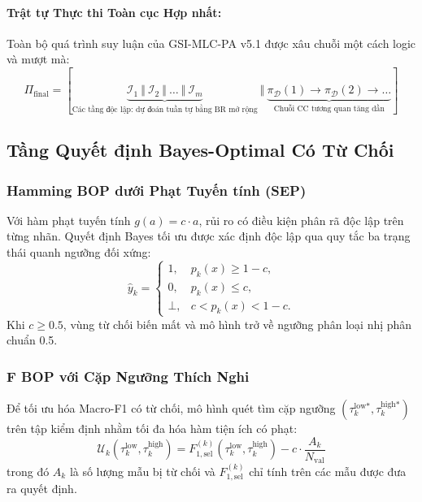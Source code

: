 \documentclass[11pt,a4paper]{article}
\begin{document}
\paragraph{Trật tự Thực thi Toàn cục Hợp nhất:}
Toàn bộ quá trình suy luận của GSI-MLC-PA v5.1 được xâu chuỗi một cách logic và mượt mà:
\begin{equation}
\Pi_{\text{final}} = \left[ \underbrace{\mathcal{I}_1 \ \Vert \ \mathcal{I}_2 \ \Vert \ \dots \ \Vert \ \mathcal{I}_m}_{\text{Các tầng độc lập: dự đoán tuần tự bằng BR mở rộng}} \ \Vert \ \underbrace{\pi_{\mathcal{D}}(1) \to \pi_{\mathcal{D}}(2) \to \dots}_{\text{Chuỗi CC tương quan tăng dần}} \right]
\end{equation}

\subsection{Tầng Quyết định Bayes-Optimal Có Từ Chối}
\subsubsection{Hamming BOP dưới Phạt Tuyến tính (SEP)}
Với hàm phạt tuyến tính $g(a) = c \cdot a$, rủi ro có điều kiện phân rã độc lập trên từng nhãn. Quyết định Bayes tối ưu được xác định độc lập qua quy tắc ba trạng thái quanh ngưỡng đối xứng:
\begin{equation}
\hat{y}_k = 
\begin{cases}
1, & p_k(x) \ge 1 - c, \\
0, & p_k(x) \le c, \\
\bot, & c < p_k(x) < 1 - c.
\end{cases}
\label{eq:bop_hamming}
\end{equation}
Khi $c \ge 0.5$, vùng từ chối biến mất và mô hình trở về ngưỡng phân loại nhị phân chuẩn 0.5.

\subsubsection{F BOP với Cặp Ngưỡng Thích Nghi}
Để tối ưu hóa Macro-F1 có từ chối, mô hình quét tìm cặp ngưỡng $(\tau_k^{\text{low}*}, \tau_k^{\text{high}*})$ trên tập kiểm định nhằm tối đa hóa hàm tiện ích có phạt:
\begin{equation}
\mathcal{U}_k(\tau_k^{\text{low}}, \tau_k^{\text{high}}) = F_{1,\text{sel}}^{(k)}(\tau_k^{\text{low}}, \tau_k^{\text{high}}) - c \cdot \frac{A_k}{N_{\text{val}}}
\end{equation}
trong đó $A_k$ là số lượng mẫu bị từ chối và $F_{1,\text{sel}}^{(k)}$ chỉ tính trên các mẫu được đưa ra quyết định.
\end{document}
